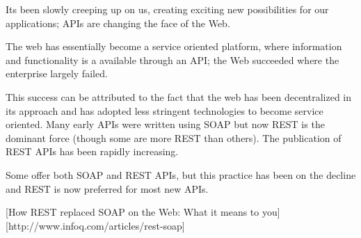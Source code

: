   Its been slowly creeping up on us, creating exciting new possibilities for our applications; APIs are changing the face of the Web.

  The web has essentially become a service oriented platform, where information and functionality is a available through an API; the Web succeeded where the enterprise largely failed.

  This success can be attributed to the fact that the web has been decentralized in its approach and has adopted less stringent technologies to become service oriented. Many early APIs were written using SOAP but now REST is the dominant force (though some are more REST than others).  The publication of REST APIs has been rapidly increasing.

  Some offer both SOAP and REST APIs, but this practice has been on the decline and REST is now preferred for most new APIs.

  [How REST replaced SOAP on the Web: What it means to you]
  [http://www.infoq.com/articles/rest-soap]
